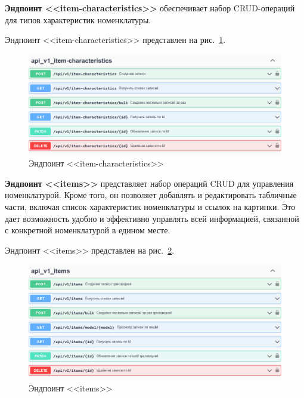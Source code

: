 \textbf{Эндпоинт <<item-characteristics>>} обеспечивает набор CRUD-операций для типов характеристик номенклатуры.

Эндпоинт <<item-characteristics>> представлен на рис.~\ref{fig:swagger_item_characteristics}.

\begin{figure}[!p]
    \centering

    \includegraphics[width=16cm]
    {images/swagger/item-characteristics.png}

    \caption{Эндпоинт <<item-characteristics>>}

    \label{fig:swagger_item_characteristics}
\end{figure}

\textbf{Эндпоинт <<items>>} представляет набор операций CRUD для управления номенклатурой.
Кроме того, он позволяет добавлять и редактировать табличные части, включая список характеристик номенклатуры и ссылок на картинки.
Это дает возможность удобно и эффективно управлять всей информацией, связанной с конкретной номенклатурой в едином месте.

Эндпоинт <<items>> представлен на рис.~\ref{fig:swagger_items}.

\begin{figure}[!p]
    \centering

    \includegraphics[width=16cm]
    {images/swagger/items.png}

    \caption{Эндпоинт <<items>>}

    \label{fig:swagger_items}
\end{figure}

